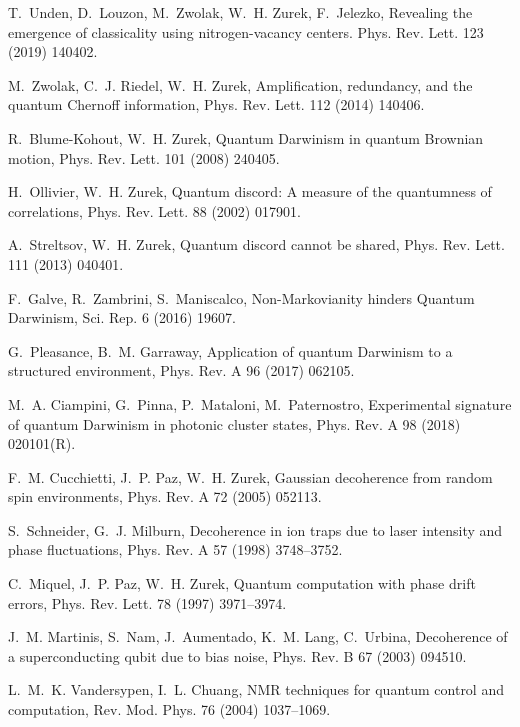 \documentclass[3p,sort&compress]{elsarticle}
\begin{document}
\begin{thebibliography}{100}
T.~Unden, D.~Louzon, M.~Zwolak, W.~H. Zurek, F.~Jelezko, Revealing the
  emergence of classicality using nitrogen-vacancy centers. Phys. Rev. Lett. 
123 (2019) 140402. 

M.~Zwolak, C.~J. Riedel, W.~H. Zurek, Amplification, redundancy, and the
  quantum {C}hernoff information, Phys. Rev. Lett. 112 (2014) 140406.

R.~Blume-Kohout, W.~H. Zurek, Quantum {D}arwinism in quantum {B}rownian motion,
  Phys. Rev. Lett. 101 (2008) 240405.

H.~Ollivier, W.~H. Zurek, Quantum discord: {A} measure of the quantumness of
  correlations, Phys. Rev. Lett. 88 (2002) 017901.

A.~Streltsov, W.~H. Zurek, Quantum discord cannot be shared, Phys. Rev. Lett.
  111 (2013) 040401.

F.~Galve, R.~Zambrini, S.~Maniscalco, Non-{M}arkovianity hinders {Q}uantum
  {D}arwinism, Sci. Rep. 6 (2016) 19607.

G.~Pleasance, B.~M. Garraway, Application of quantum {D}arwinism to a
  structured environment, Phys. Rev. A 96 (2017) 062105.

M.~A. Ciampini, G.~Pinna, P.~Mataloni, M.~Paternostro, Experimental signature
  of quantum {D}arwinism in photonic cluster states, Phys. Rev. A 98 (2018)
  020101(R).

F.~M. Cucchietti, J.~P. Paz, W.~H. Zurek, Gaussian decoherence from random spin
  environments, Phys. Rev. A 72 (2005) 052113.

S.~Schneider, G.~J. Milburn, Decoherence in ion traps due to laser intensity
  and phase fluctuations, Phys. Rev. A 57 (1998) 3748--3752.

C.~Miquel, J.~P. Paz, W.~H. Zurek, Quantum computation with phase drift errors,
  Phys. Rev. Lett. 78 (1997) 3971--3974.

J.~M. Martinis, S.~Nam, J.~Aumentado, K.~M. Lang, C.~Urbina, Decoherence of a
  superconducting qubit due to bias noise, Phys. Rev. B 67 (2003) 094510.

L.~M.~K. Vandersypen, I.~L. Chuang, {NMR} techniques for quantum control and
  computation, Rev. Mod. Phys. 76 (2004) 1037--1069.


\end{thebibliography}
\end{document}
